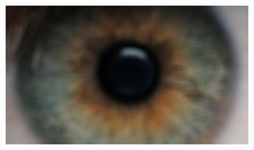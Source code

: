 \documentclass{article}
\begin{document}
\begin{figure}[H]
\begin{subfigure}{.47\textwidth}
  \centering
  \includegraphics[width=0.97\linewidth]{_Figures/raw_data_1_blur.png}
  \caption{}
  \label{fig:raw_1_blur}
\end{subfigure}


\end{figure}
\end{document}
